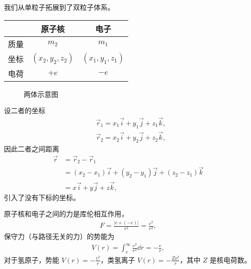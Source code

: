 我们从单粒子拓展到了双粒子体系。
\begin{table}[ht]
\centering
\begin{tabular}[t]{lcc}
\toprule
&原子核 & 电子 \\
\midrule
质量 & $m_2$ & $m_1$ \\
坐标 & $(x_2,y_2,z_2)$ & $(x_1,y_1,z_1)$\\
电荷 & $+e$ & $-e$ \\
\bottomrule
\end{tabular}
\end{table}%

\begin{figure}[tp]\centering
    \caption{两体示意图}
    \end{figure}
设二者的坐标
\begin{align}
    &\vec r_1 = x_1 \vec i + y_1 \vec j + z_1 \vec k, \\
    &\vec r_2 = x_2 \vec i + y_2 \vec j + z_2 \vec k,
\end{align}
因此二者之间距离
\begin{align}
    \vec r &= \vec r_2 - \vec r_1 \\
    &= (x_2 - x_1) \vec i + (y_2 - y_1) \vec j + (z_2 - z_1) \vec k\\
    &=x \vec i + y \vec j + z \vec k,
\end{align}
引入了没有下标的坐标。

原子核和电子之间的力是库伦相互作用，
\begin{align}
    F = \frac{|e\times(-e)|}{r^2} = \frac{e^2}{r^2},
\end{align}
保守力（与路径无关的力）的势能为
\begin{align}
    V(r) = \int_r^\infty \frac{e^2}{r^2} \dd r = - \frac{e}{r},
\end{align}
对于氢原子，势能 $V(r) = -\frac{e^2}{r}$，类氢离子 $V(r) = - \frac{Z \ee^2}{r}$，其中 $Z$ 是核电荷数。


